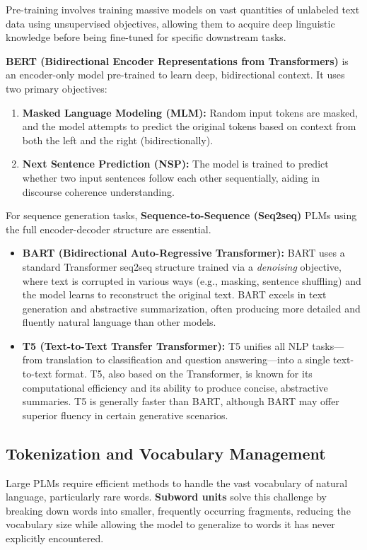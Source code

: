 \documentclass{article}
\begin{document}
Pre-training involves training massive models on vast quantities of unlabeled text data using unsupervised objectives, allowing them to acquire deep linguistic knowledge before being fine-tuned for specific downstream tasks.

\textbf{BERT (Bidirectional Encoder Representations from Transformers)} is an encoder-only model pre-trained to learn deep, bidirectional context. It uses two primary objectives:
\begin{enumerate}
    \item \textbf{Masked Language Modeling (MLM):} Random input tokens are masked, and the model attempts to predict the original tokens based on context from both the left and the right (bidirectionally).
    \item \textbf{Next Sentence Prediction (NSP):} The model is trained to predict whether two input sentences follow each other sequentially, aiding in discourse coherence understanding.
\end{enumerate}

For sequence generation tasks, \textbf{Sequence-to-Sequence (Seq2seq)} PLMs using the full encoder-decoder structure are essential.
\begin{itemize}
    \item \textbf{BART (Bidirectional Auto-Regressive Transformer):} BART uses a standard Transformer seq2seq structure trained via a \textit{denoising} objective, where text is corrupted in various ways (e.g., masking, sentence shuffling) and the model learns to reconstruct the original text. BART excels in text generation and abstractive summarization, often producing more detailed and fluently natural language than other models.
    \item \textbf{T5 (Text-to-Text Transfer Transformer):} T5 unifies all NLP tasks—from translation to classification and question answering—into a single text-to-text format. T5, also based on the Transformer, is known for its computational efficiency and its ability to produce concise, abstractive summaries. T5 is generally faster than BART, although BART may offer superior fluency in certain generative scenarios.
\end{itemize}

\subsection{Tokenization and Vocabulary Management}

Large PLMs require efficient methods to handle the vast vocabulary of natural language, particularly rare words. \textbf{Subword units} solve this challenge by breaking down words into smaller, frequently occurring fragments, reducing the vocabulary size while allowing the model to generalize to words it has never explicitly encountered.
\end{document}
